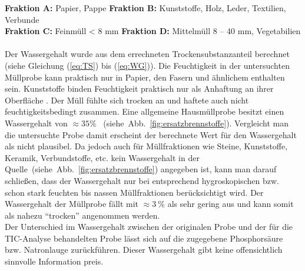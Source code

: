 \FloatBarrier
{\footnotesize \textbf{Fraktion A:} Papier, Pappe \quad \quad \quad \hspace*{0.7mm} \textbf{Fraktion B:} Kunststoffe, Holz, Leder, Textilien, Verbunde}\\
{\footnotesize \textbf{Fraktion C:} Feinmüll < 8 mm \quad \quad \textbf{Fraktion D:} Mittelmüll 8 – 40 mm, Vegetabilien}\\ \\
Der Wassergehalt wurde aus dem errechneten Trockensubstanzanteil berechnet (siehe Gleichung (\ref{eq:TS}) bis (\ref{eq:WG})).
Die Feuchtigkeit in der untersuchten Müllprobe kann praktisch nur in Papier, den Fasern und ähnlichem enthalten sein. Kunststoffe binden Feuchtigkeit praktisch nur als Anhaftung an ihrer Oberfläche \cite[S.3]{LLA_Abfallanalyse}. Der Müll fühlte sich trocken an und haftete auch nicht feuchtigkeitsbedingt zusammen.
Eine allgemeine Hausmüllprobe besitzt einen Wassergehalt von \mbox{$\approx 35\%$ } \mbox{(siehe Abb. \ref{fig:ersatzbrennstoffe})}. Vergleicht man die untersuchte Probe damit erscheint der berechnete Wert für den Wassergehalt als nicht plausibel. 
\newpage
Da jedoch auch für Müllfraktionen wie Steine, Kunststoffe, Keramik, Verbundstoffe, etc. kein Wassergehalt in der \mbox{Quelle (siehe Abb. \ref{fig:ersatzbrennstoffe})} angegeben ist, kann man darauf schließen, dass der Wassergehalt nur bei entsprechend hygroskopischen bzw. schon stark feuchten bis nassen Müllfraktionen berücksichtigt wird. Der Wassergehalt der Müllprobe fällt mit $\approx \SI{3}{\percent}$ als sehr gering aus und kann somit als nahezu "`trocken"' angenommen werden.\\
Der Unterschied im Wassergehalt zwischen der originalen Probe und der für die TIC-Analyse behandelten Probe lässt sich auf die zugegebene Phosphorsäure bzw. Natronlauge zurückführen. Dieser Wassergehalt gibt keine offensichtlich sinnvolle Information preis.


